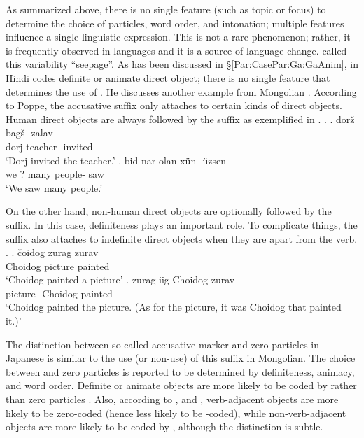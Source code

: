 As summarized above,
there is no single feature (such as topic or focus) to determine
the choice of particles, word order, and intonation;
multiple features influence a single linguistic expression.
This is not a rare phenomenon;
rather, it is frequently observed in languages and
it is a source of language change.
 called this variability ``seepage''.
As has been discussed in \S \ref{Par:CasePar:Ga:GaAnim},
 in Hindi codes definite or animate direct object;
there is no single feature that determines the use of .
He discusses another example from Mongolian \cite{poppe70}.
According to Poppe, the accusative suffix  only attaches to certain kinds of direct objects.
Human direct objects are always followed by the suffix as exemplified in
\Next.
%
\ex.\label{Disc:Ex:Mongolian1}
 \ag. dor\v{z} bag\v{s}- zalav \\
	dorj teacher-{} invited \\
	`Dorj invited the teacher.'
 \bg. bid nar olan x\"{u}n- \"{u}zsen \\
	we ? many people-{} saw \\
	`We saw many people.'
	\hfill{\cite[18]{comrie79}}

On the other hand, non-human direct objects are optionally followed by the suffix.
In this case,
definiteness plays an important role.
To complicate things,
the suffix also attaches to indefinite direct objects
when they are apart from the verb.
%
\ex.\label{Disc:Ex:Mongolian2}
 \ag. \v{c}oidog zurag zurav \\
	Choidog picture painted \\
	`Choidog painted a picture'
 \bg. zurag-iig Choidog zurav \\
	picture- Choidog painted \\
	`Choidog painted the picture. (As for the picture, it was Choidog that painted it.)'
	\hfill{\cite[19]{comrie79}}

The distinction between so-called accusative marker  and zero particles in Japanese is similar to the use (or non-use) of this suffix  in Mongolian.
The choice between  and zero particles is reported to be determined by definiteness, animacy, and word order.
Definite or animate objects are more likely to be coded by 
rather than zero particles \cite{minashima01,fry01,kurumadajaeger13,kurumadajaeger15}.
Also,
according to , and ,
verb-adjacent objects are more likely to be zero-coded (hence less likely to be -coded),
while non-verb-adjacent objects are more likely to be coded by ,
although the distinction is subtle.



